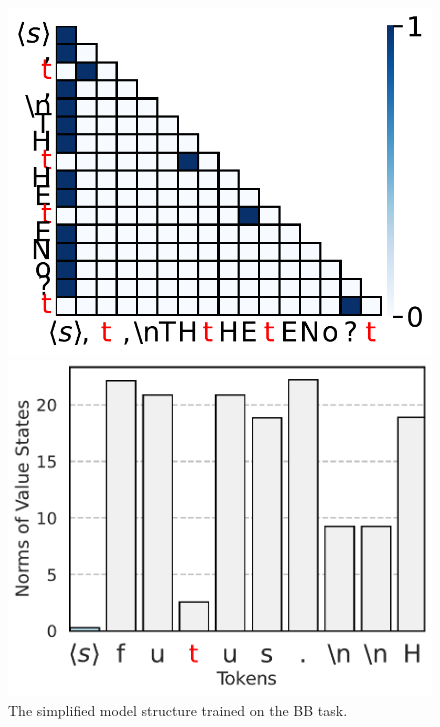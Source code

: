 \begin{figure}[t]
  \centering
  \begin{minipage}{0.3\textwidth}
      \centering
      \vspace{-.2em}
      \includegraphics[width=\linewidth]{Figures/BBM_appendix/simple_attn_fig0.pdf}
  \end{minipage}
  \begin{minipage}{0.3\textwidth}
      \centering
      \vspace{-.2em}
      \includegraphics[width=\linewidth]{Figures/BBM_appendix/simple_value_states_layer_0.pdf}
  \end{minipage}
  \caption{\small The simplified model structure trained on the BB task.}
  \label{appfigure:simple-static}
  \vspace{-1em}
\end{figure}

